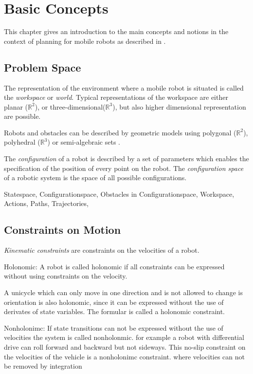 \chapter{Basic Concepts}\label{ch:introductionplanning}
This chapter gives an introduction to the main concepts and notions in the context of planning for mobile robots as described in \cite{Choset_2005_5167}\cite{LaValle2006}.

\section{Problem Space}\label{sec:basic}
The representation of the environment where a mobile robot is situated is called the \emph{workspace} or \emph{world}.
Typical representations of the workspace are either planar ($\mathbb{R}^2$), or three-dimensional($\mathbb{R}^3$), but also higher dimensional representation are possible.

Robots and obstacles can be described by geometric models using polygonal ($\mathbb{R}^2$), polyhedral ($\mathbb{R}^3$) or semi-algebraic sets \cite{LaValle2006}.

The \emph{configuration} of a robot is described by a set of parameters which enables the specification of the position of every point on the robot. The \emph{configuration space} of a robotic system is the space of all possible configurations.

Statespace,
Configurationspace,
Obstacles in Configurationspace,
Workspace,
Actions,
Paths,
Trajectories,

\section{Constraints on Motion}\label{sec:model}

\emph{Kinematic constraints} are constraints on the velocities of a robot.

Holonomic:
A robot is called holonomic if all constraints can be expressed without using constraints on the velocity. 

A unicycle which can only move in one direction and is not allowed to change is orientation is also holonomic, since  it can be expressed without the use of derivates of state variables.
The formular is called a holonomic constraint.

Nonholonimc:
If state transitions can not be expressed without the use of velocities the system is called nonholonmic.
for example a robot with differential drive can roll forward and backward but not sideways. 
This no-slip constraint on the velocities of the vehicle is a nonholonimc constraint.
where velocities can not be removed by integration 

